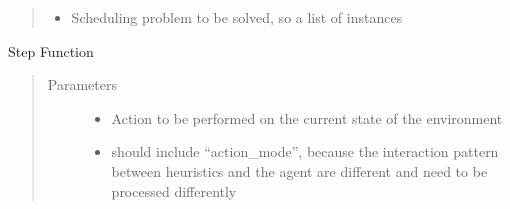 \documentclass[letterpaper,10pt,english]{sphinxmanual}
\begin{document}
\begin{fulllineitems}
\begin{quote}
\begin{description}
\begin{itemize}
\item {} 
\sphinxAtStartPar
{} \textendash{} Scheduling problem to be solved, so a list of instances

\end{itemize}

\end{description}\end{quote}

\begin{fulllineitems}
\label{\detokenize{environments:environments.env_tetris_scheduling_indirect_action.IndirectActionEnv.__init__}}
\end{fulllineitems}


\begin{fulllineitems}
\label{\detokenize{environments:environments.env_tetris_scheduling_indirect_action.IndirectActionEnv.step}}
\sphinxAtStartPar
Step Function
\begin{quote}\begin{description}
\item[{Parameters}] \leavevmode\begin{itemize}
\item {} 
\sphinxAtStartPar
{} \textendash{} Action to be performed on the current state of the environment

\item {} 
\sphinxAtStartPar
{} \textendash{} should include “action\_mode”, because the interaction pattern between heuristics and
the agent are different and need to be processed differently


\end{itemize}
\end{description}
\end{quote}
\end{fulllineitems}
\end{fulllineitems}
\end{document}
